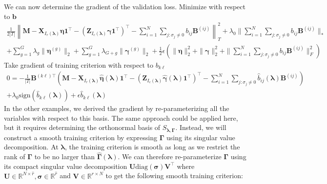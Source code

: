\documentclass[12pt,letterpaper]{article}
\begin{document}
We can now determine the gradient of the validation loss. Minimize with respect to $\boldsymbol{b}$
\begin{equation}
\begin{array}{c}
\frac{1}{2|T|} 
\left \| 
\boldsymbol{M} 
- \boldsymbol{X}_{I_r(\boldsymbol{\lambda})} \boldsymbol{\eta} \boldsymbol{1}^\top 
- (\boldsymbol{Z}_{I_c(\boldsymbol{\lambda})} \boldsymbol{\gamma}  \boldsymbol{1}^\top )^\top
- \sum_{i=1}^N \sum_{j : \sigma_j \ne 0} b_{ij} \boldsymbol{B}^{(ij)}
\right \|^2_T
+ \lambda_0 \| \sum_{i=1}^N \sum_{j : \sigma_j \ne 0} b_{ij} \boldsymbol{B}^{(ij)} \|_*
\\
+ \sum_{g=1}^G  \lambda_g \| \boldsymbol\eta^{(g)} \|_2
+ \sum_{g=1}^G  \lambda_{G+g} \| \boldsymbol\gamma^{(g)} \|_2
+ \frac{1}{2} \epsilon \left (
\| \boldsymbol\eta \|_2^2 + \| \boldsymbol\gamma \|_2^2 
+ \| \sum_{i=1}^N \sum_{j : \sigma_j \ne 0} b_{ij} \boldsymbol{B}^{(ij)}\|^2_F
\right )
\end{array}
\end{equation}
Take gradient of training criterion with respect to $b_{k\ell}$
\begin{equation}
\begin{array}{c}
0 =
- \frac{1}{|T|} 
\boldsymbol{B}^{(k\ell)\top}
\left (
\boldsymbol{M} 
- \boldsymbol{X}_{I_r(\boldsymbol{\lambda})} \hat{\boldsymbol{\eta}}(\boldsymbol{\lambda}) \boldsymbol{1}^\top 
- (\boldsymbol{Z}_{I_c(\boldsymbol{\lambda})} \hat{\boldsymbol{\gamma}}(\boldsymbol{\lambda})  \boldsymbol{1}^\top )^\top
- \sum_{i=1}^N \sum_{j : \sigma_j \ne 0} \hat{b}_{ij}(\boldsymbol{\lambda}) \boldsymbol{B}^{(ij)}
\right )\\
+ \lambda_0 \text{sign}(
\hat{b}_{k\ell}(\boldsymbol{\lambda})
)
+ \epsilon \hat{b}_{k\ell}(\boldsymbol{\lambda})
\end{array}
\end{equation}
In the other examples, we derived the gradient by re-parameterizing all the variables with respect to this basis. The same approach could be applied here, but it requires determining the orthonormal basis of $S_{\boldsymbol{\lambda}, \boldsymbol{\Gamma}}$. Instead, we will construct a smooth training criterion by expressing $\boldsymbol{\Gamma}$ using its singular value decomposition. At $\boldsymbol{\lambda}$, the training criterion is smooth as long as we restrict the rank of $\boldsymbol{\Gamma}$ to be no larger than $\hat{\boldsymbol{\Gamma}}(\boldsymbol{\lambda})$. We can therefore re-parameterize $\boldsymbol{\Gamma}$ using its compact singular value decomposition $\boldsymbol{U} \text{diag}(\boldsymbol{\sigma}) \boldsymbol{V}^\top$ where $\boldsymbol{U} \in  \mathbb{R}^{N \times \hat{r}}, \boldsymbol{\sigma} \in  \mathbb{R}^{\hat{r}}$ and $\boldsymbol{V} \in  \mathbb{R}^{\hat{r} \times N}$ to get the following smooth training criterion:
\end{document}

